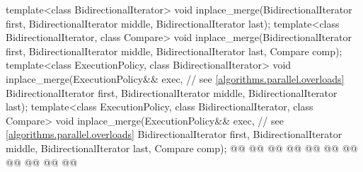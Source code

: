 \begin{codeblock}
{  template<class BidirectionalIterator>
    void inplace_merge(BidirectionalIterator first,
                       BidirectionalIterator middle,
                       BidirectionalIterator last);
  template<class BidirectionalIterator, class Compare>
    void inplace_merge(BidirectionalIterator first,
                       BidirectionalIterator middle,
                       BidirectionalIterator last, Compare comp);
  template<class ExecutionPolicy, class BidirectionalIterator>
    void inplace_merge(ExecutionPolicy&& exec, // see \ref{algorithms.parallel.overloads}
                       BidirectionalIterator first,
                       BidirectionalIterator middle,
                       BidirectionalIterator last);
  template<class ExecutionPolicy, class BidirectionalIterator, class Compare>
    void inplace_merge(ExecutionPolicy&& exec, // see \ref{algorithms.parallel.overloads}
                       BidirectionalIterator first,
                       BidirectionalIterator middle,
                       BidirectionalIterator last, Compare comp);
  @@
    @@
        @@
      @@
      @@
    @@
      @@
      @@
        @@
                      @@
  @\added{\}}@

}
\end{codeblock}
